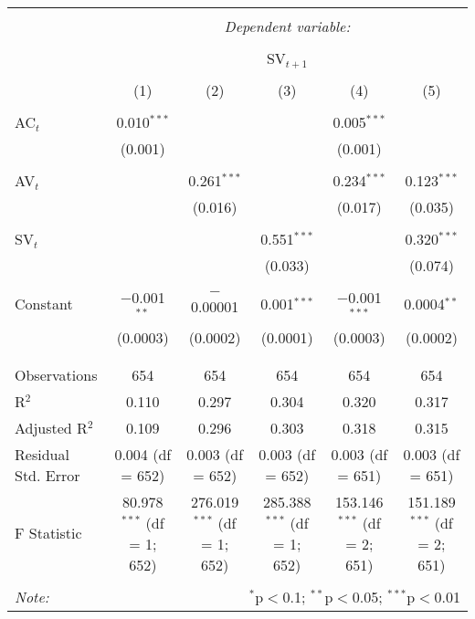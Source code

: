 
\begin{table}[!htbp] \centering 
  \caption{} 
  \label{} 
\begin{tabular}{@{\extracolsep{5pt}}lccccc} 
\\[-1.8ex]\hline 
\hline \\[-1.8ex] 
 & \multicolumn{5}{c}{\textit{Dependent variable:}} \\ 
\cline{2-6} 
\\[-1.8ex] & \multicolumn{5}{c}{SV$_{t+1}$} \\ 
\\[-1.8ex] & (1) & (2) & (3) & (4) & (5)\\ 
\hline \\[-1.8ex] 
 AC$_{t}$ & 0.010$^{***}$ &  &  & 0.005$^{***}$ &  \\ 
  & (0.001) &  &  & (0.001) &  \\ 
  & & & & & \\ 
 AV$_{t}$ &  & 0.261$^{***}$ &  & 0.234$^{***}$ & 0.123$^{***}$ \\ 
  &  & (0.016) &  & (0.017) & (0.035) \\ 
  & & & & & \\ 
 SV$_{t}$ &  &  & 0.551$^{***}$ &  & 0.320$^{***}$ \\ 
  &  &  & (0.033) &  & (0.074) \\ 
  & & & & & \\ 
 Constant & $-$0.001$^{**}$ & $-$0.00001 & 0.001$^{***}$ & $-$0.001$^{***}$ & 0.0004$^{**}$ \\ 
  & (0.0003) & (0.0002) & (0.0001) & (0.0003) & (0.0002) \\ 
  & & & & & \\ 
\hline \\[-1.8ex] 
Observations & 654 & 654 & 654 & 654 & 654 \\ 
R$^{2}$ & 0.110 & 0.297 & 0.304 & 0.320 & 0.317 \\ 
Adjusted R$^{2}$ & 0.109 & 0.296 & 0.303 & 0.318 & 0.315 \\ 
Residual Std. Error & 0.004 (df = 652) & 0.003 (df = 652) & 0.003 (df = 652) & 0.003 (df = 651) & 0.003 (df = 651) \\ 
F Statistic & 80.978$^{***}$ (df = 1; 652) & 276.019$^{***}$ (df = 1; 652) & 285.388$^{***}$ (df = 1; 652) & 153.146$^{***}$ (df = 2; 651) & 151.189$^{***}$ (df = 2; 651) \\ 
\hline 
\hline \\[-1.8ex] 
\textit{Note:}  & \multicolumn{5}{r}{$^{*}$p$<$0.1; $^{**}$p$<$0.05; $^{***}$p$<$0.01} \\ 
\end{tabular} 
\end{table} 
